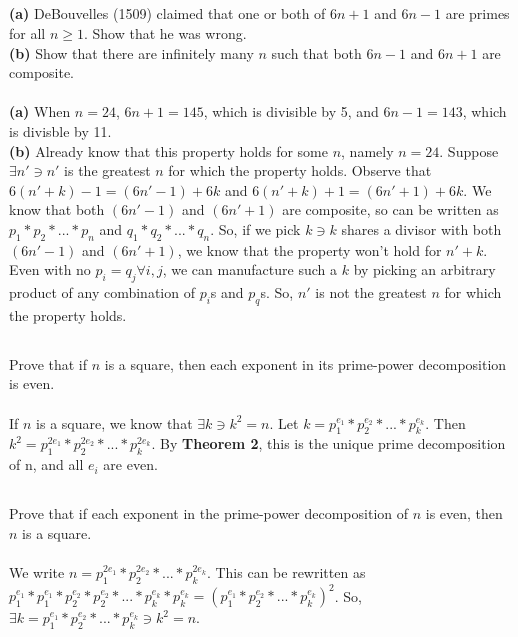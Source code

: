 \documentclass{article}
\begin{document}
\subsection{}
\textbf{(a)} DeBouvelles (1509) claimed that one or both of $6n + 1$ and $6n - 1$
are primes for all $n \geq 1$. Show that he was wrong.\\
\textbf{(b)} Show that there are infinitely many $n$ such that both $6n - 1$ and
$6n + 1$ are composite.\\~\\
\textbf{(a)} When $n = 24$, $6n + 1 = 145$, which is divisible by 5, and
$6n - 1 = 143$, which is divisble by 11.\\
\textbf{(b)} Already know that this property holds for some $n$, namely $n = 24$.
Suppose $\exists n' \ni n'$ is the greatest $n$ for which the property holds.
Observe that $6(n' + k) - 1 = (6n' - 1) + 6k$ and $6(n' + k) + 1 = (6n' + 1) + 6k$.
We know that both $(6n' - 1)$ and $(6n' + 1)$ are composite,
so can be written as $p_1*p_2*...*p_n$ and $q_1*q_2*...*q_n$.
So, if we pick $k \ni k$ shares a divisor with both $(6n' - 1)$ and $(6n' + 1)$,
we know that the property won't hold for $n' + k$.
Even with no $p_i = q_j \forall i, j$, we can manufacture such a $k$ by picking an
arbitrary product of any combination of $p_i$s and $p_q$s.
So, $n'$ is not the greatest $n$ for which the property holds.

\subsection{}
Prove that if $n$ is a square, then each exponent in its prime-power
decomposition is even.\\~\\
If $n$ is a square, we know that $\exists k \ni k^2 = n$.
Let $k = p_1^{e_1}*p_2^{e_2}*...*p_k^{e_k}$.
Then $k^2 = p_1^{2e_1}*p_2^{2e_2}*...*p_k^{2e_k}$.
By \textbf{Theorem 2}, this is the unique prime decomposition of n,
and all $e_i$ are even.

\subsection{}
Prove that if each exponent in the prime-power decomposition of $n$ is even,
then $n$ is a square.\\~\\
We write $n = p_1^{2e_1}*p_2^{2e_2}*...*p_k^{2e_k}$.
This can be rewritten as $p_1^{e_1}*p_1^{e_1}*p_2^{e_2}*p_2^{e_2}*...*p_k^{e_k}*p_k^{e_k} =
(p_1^{e_1}*p_2^{e_2}*...*p_k^{e_k})^2$.
So, $\exists k = p_1^{e_1}*p_2^{e_2}*...*p_k^{e_k} \ni k^2 = n$.
 
\end{document}
